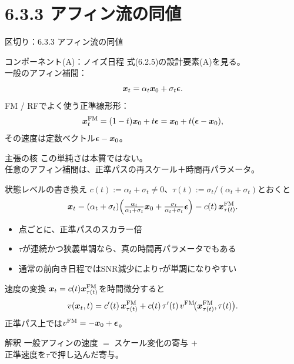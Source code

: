 \section{6.3.3 アフィン流の同値}
\asmain
\begin{frame}{区切り：6.3.3 アフィン流の同値}
    \tableofcontents[currentsection]
\end{frame}
\asmain
\begin{frame}{コンポーネント(A)：ノイズ日程}
    式(6.2.5)の設計要素(A)を見る。\\
    一般のアフィン補間：
    \[
        \bm{x}_t = \alpha_t\bm{x}_0 + \sigma_t\bm{\epsilon}.
    \]
    FM / RFでよく使う正準線形形：
    \[
        \bm{x}_t^{\mathrm{FM}}
        =
        (1-t)\bm{x}_0 + t\bm{\epsilon}
        =
        \bm{x}_0 + t(\bm{\epsilon}-\bm{x}_0),
    \]
    その速度は定数ベクトル$\bm{\epsilon}-\bm{x}_0$。
    \begin{block}{主張の核}
        この単純さは本質ではない。\\
        任意のアフィン補間は、正準パスの再スケール＋時間再パラメータ。
    \end{block}
\end{frame}
\asmain
\begin{frame}{状態レベルの書き換え}
    $c(t):=\alpha_t+\sigma_t\neq 0$、$\tau(t):=\sigma_t/(\alpha_t+\sigma_t)$とおくと
    \[
        \bm{x}_t
        =
        (\alpha_t+\sigma_t)
        \Bigl(
            \tfrac{\alpha_t}{\alpha_t+\sigma_t}\bm{x}_0
            +
            \tfrac{\sigma_t}{\alpha_t+\sigma_t}\bm{\epsilon}
        \Bigr)
        =
        c(t)\,\bm{x}_{\tau(t)}^{\mathrm{FM}}.
    \]
    \begin{itemize}
        \item 点ごとに、正準パスのスカラー倍
        \item $\tau$が連続かつ狭義単調なら、真の時間再パラメータでもある
        \item 通常の前向き日程ではSNR減少により$\tau$が単調になりやすい
    \end{itemize}
\end{frame}
\asmain
\begin{frame}{速度の変換}
    $\bm{x}_t=c(t)\bm{x}_{\tau(t)}^{\mathrm{FM}}$を時間微分すると
    \[
        v(\bm{x}_t,t)
        =
        c'(t)\,\bm{x}_{\tau(t)}^{\mathrm{FM}}
        +
        c(t)\,\tau'(t)\,
        v^{\mathrm{FM}}\!\bigl(\bm{x}_{\tau(t)}^{\mathrm{FM}},\tau(t)\bigr).
    \]
    正準パス上では$v^{\mathrm{FM}}=-\bm{x}_0+\bm{\epsilon}$。
    \begin{exampleblock}{解釈}
        一般アフィンの速度 $=$ スケール変化の寄与 $+$\\
        正準速度を$\tau$で押し込んだ寄与。
    \end{exampleblock}
\end{frame}
